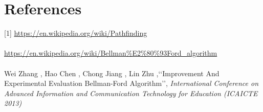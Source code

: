 \documentclass[12pt]{article}
\begin{document}
\section{References}
[1] \url{https://en.wikipedia.org/wiki/Pathfinding} \\
\\ \noindent
[2] \url{https://en.wikipedia.org/wiki/Bellman\%E2\%80\%93Ford_algorithm} \\
\\ \noindent
[3] Wei Zhang , Hao Chen , Chong Jiang , Lin Zhu ,\lq\lq{}Improvement And Experimental Evaluation Bellman-Ford Algorithm\rq\rq{}, \textit{International Conference on Advanced Information and Communication Technology for Education (ICAICTE 2013)}
\end{document}
